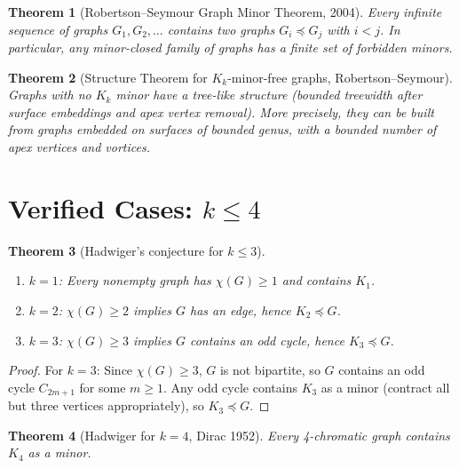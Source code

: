 \documentclass[12pt,a4paper]{amsart}
\newtheorem{theorem}{Theorem}[section]
\theoremstyle{definition}
\theoremstyle{remark}
\begin{document}
\begin{theorem}[Robertson--Seymour Graph Minor Theorem, 2004]\label{thm:GMT}
Every infinite sequence of graphs $G_1, G_2, \ldots$ contains two graphs
$G_i \preceq G_j$ with $i < j$. In particular, any minor-closed family of
graphs has a finite set of forbidden minors.
\end{theorem}

\begin{theorem}[Structure Theorem for $K_k$-minor-free graphs, Robertson--Seymour]\label{thm:struct}
Graphs with no $K_k$ minor have a tree-like structure (bounded treewidth
after surface embeddings and apex vertex removal). More precisely, they can
be built from graphs embedded on surfaces of bounded genus, with a bounded
number of apex vertices and vortices.
\end{theorem}

\section{Verified Cases: \texorpdfstring{$k \leq 4$}{k <= 4}}

\begin{theorem}[Hadwiger's conjecture for $k \leq 3$]\label{thm:k3}
\begin{enumerate}[label=(\roman*)]
  \item $k = 1$: Every nonempty graph has $\chi(G) \geq 1$ and contains $K_1$.
  \item $k = 2$: $\chi(G) \geq 2$ implies $G$ has an edge, hence $K_2 \preceq G$.
  \item $k = 3$: $\chi(G) \geq 3$ implies $G$ contains an odd cycle, hence $K_3 \preceq G$.
\end{enumerate}
\end{theorem}

\begin{proof}
For $k = 3$: Since $\chi(G) \geq 3$, $G$ is not bipartite, so $G$ contains
an odd cycle $C_{2m+1}$ for some $m \geq 1$. Any odd cycle contains $K_3$ as
a minor (contract all but three vertices appropriately), so $K_3 \preceq G$.
\end{proof}

\begin{theorem}[Hadwiger for $k = 4$, Dirac 1952]\label{thm:k4}
Every 4-chromatic graph contains $K_4$ as a minor.
\end{theorem}
\end{document}
